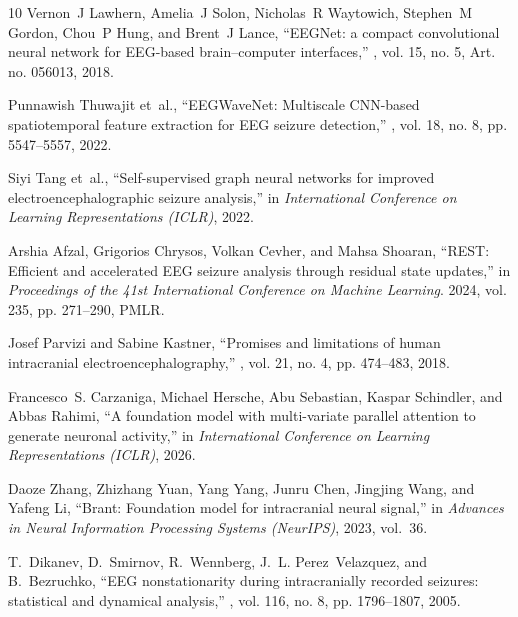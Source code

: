 \documentclass[letterpaper]{article}
\begin{document}
\begin{thebibliography}{10}
Vernon~J Lawhern, Amelia~J Solon, Nicholas~R Waytowich, Stephen~M Gordon,
  Chou~P Hung, and Brent~J Lance,
\newblock ``{EEGNet}: a compact convolutional neural network for {EEG}-based
  brain--computer interfaces,''
, vol. 15, no. 5, Art. no. 056013,
  2018.

Punnawish Thuwajit et~al.,
\newblock ``{EEGWaveNet}: Multiscale {CNN}-based spatiotemporal feature
  extraction for {EEG} seizure detection,''
, vol. 18, no. 8,
  pp. 5547--5557, 2022.

Siyi Tang et~al.,
\newblock ``Self-supervised graph neural networks for improved
  electroencephalographic seizure analysis,''
\newblock in {\em International Conference on Learning Representations (ICLR)},
  2022.

Arshia Afzal, Grigorios Chrysos, Volkan Cevher, and Mahsa Shoaran,
\newblock ``{REST}: Efficient and accelerated {EEG} seizure analysis through
  residual state updates,''
\newblock in {\em Proceedings of the 41st International Conference on Machine
  Learning}. 2024, vol. 235, pp. 271--290, PMLR.

Josef Parvizi and Sabine Kastner,
\newblock ``Promises and limitations of human intracranial
  electroencephalography,''
, vol. 21, no. 4, pp. 474--483, 2018.

Francesco~S. Carzaniga, Michael Hersche, Abu Sebastian, Kaspar Schindler, and
  Abbas Rahimi,
\newblock ``A foundation model with multi-variate parallel attention to
  generate neuronal activity,''
\newblock in {\em International Conference on Learning Representations (ICLR)},
  2026.

Daoze Zhang, Zhizhang Yuan, Yang Yang, Junru Chen, Jingjing Wang, and Yafeng
  Li,
\newblock ``Brant: Foundation model for intracranial neural signal,''
\newblock in {\em Advances in Neural Information Processing Systems (NeurIPS)},
  2023, vol.~36.

T.~Dikanev, D.~Smirnov, R.~Wennberg, J.~L. Perez~Velazquez, and B.~Bezruchko,
\newblock ``{EEG} nonstationarity during intracranially recorded seizures:
  statistical and dynamical analysis,''
, vol. 116, no. 8, pp. 1796--1807,
  2005.


\end{thebibliography}
\end{document}
